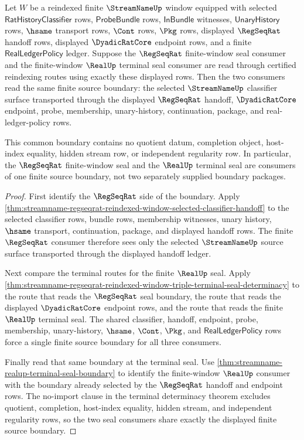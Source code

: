 \begin{theorem}
\label{thm:streamname-regseqrat-realup-common-window-seal}
Let $W$ be a reindexed finite $\StreamNameUp$ window equipped with selected
$\mathsf{RatHistoryClassifier}$ rows, $\mathsf{ProbeBundle}$ rows,
$\mathsf{InBundle}$ witnesses, $\mathsf{UnaryHistory}$ rows, $\hsame$
transport rows, $\Cont$ rows, $\Pkg$ rows, displayed $\RegSeqRat$ handoff
rows, displayed $\DyadicRatCore$ endpoint rows, and a finite
$\mathsf{RealLedgerPolicy}$ ledger. Suppose the $\RegSeqRat$ finite-window
seal consumer and the finite-window $\RealUp$ terminal seal consumer are read
through certified reindexing routes using exactly these displayed rows. Then
the two consumers read the same finite source boundary: the selected
$\StreamNameUp$ classifier surface transported through the displayed
$\RegSeqRat$ handoff, $\DyadicRatCore$ endpoint, probe, membership,
unary-history, continuation, package, and real-ledger-policy rows.

This common boundary contains no quotient datum, completion object, host-index
equality, hidden stream row, or independent regularity row. In particular, the
$\RegSeqRat$ finite-window seal and the $\RealUp$ terminal seal are consumers
of one finite source boundary, not two separately supplied boundary packages.
\end{theorem}
\begin{proof}
First identify the $\RegSeqRat$ side of the boundary. Apply
\autoref{thm:streamname-regseqrat-reindexed-window-selected-classifier-handoff}
to the selected classifier rows, bundle rows, membership witnesses, unary
history, $\hsame$ transport, continuation, package, and displayed handoff
rows. The finite $\RegSeqRat$ consumer therefore sees only the selected
$\StreamNameUp$ source surface transported through the displayed handoff
ledger.

Next compare the terminal routes for the finite $\RealUp$ seal. Apply
\autoref{thm:streamname-regseqrat-reindexed-window-triple-terminal-seal-determinacy}
to the route that reads the $\RegSeqRat$ seal boundary, the route that reads
the displayed $\DyadicRatCore$ endpoint rows, and the route that reads the
finite $\RealUp$ terminal seal. The shared classifier, handoff, endpoint,
probe, membership, unary-history, $\hsame$, $\Cont$, $\Pkg$, and
$\mathsf{RealLedgerPolicy}$ rows force a single finite source boundary for
all three consumers.

Finally read that same boundary at the terminal seal. Use
\autoref{thm:streamname-realup-terminal-seal-boundary} to identify the
finite-window $\RealUp$ consumer with the boundary already selected by the
$\RegSeqRat$ handoff and endpoint rows. The no-import clause in the terminal
determinacy theorem excludes quotient, completion, host-index equality,
hidden stream, and independent regularity rows, so the two seal consumers
share exactly the displayed finite source boundary.
\end{proof}
